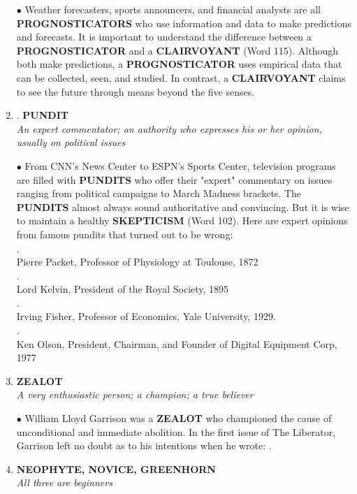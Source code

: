 \documentclass{book}
\begin{document}
\begin{enumerate}
$ \bullet $ Weather forecasters, sports announcers, and financial
analysts are all \textbf{PROGNOSTICATORS} who use information and data to make predictions and forecasts. It is
important to understand the difference between a
\textbf{PROGNOSTICATOR} and a \textbf{CLAIRVOYANT} (Word 115).
Although both make predictions, a \textbf{PROGNOSTICATOR} uses empirical data that can be collected, seen,
and studied. In contrast, a \textbf{CLAIRVOYANT} claims to
see the future through means beyond the five senses.

 \item. \textbf{PUNDIT}\\
\textit{An expert commentator; an authority who
expresses his or her opinion, usually on
political issues}

$ \bullet $ From CNN's News Center to ESPN's Sports Center,
television programs are filled with \textbf{PUNDITS} who
offer their "expert" commentary on issues ranging
from political campaigns to March Madness brackets.
The \textbf{PUNDITS} almost always sound authoritative and
convincing. But it is wise to maintain a healthy
\textbf{SKEPTICISM} (Word 102). Here are expert opinions
from famous pundits that turned out to be wrong:\\

.\\
Pierre Packet, Professor of Physiology at
Toulouse, 1872\\

.\\
Lord Kelvin, President of the Royal Society,
1895\\

.\\
Irving Fisher, Professor of Economics, Yale
University, 1929.\\

 .\\
Ken Olson, President, Chairman, and
Founder of Digital Equipment Corp, 1977

 \item \textbf{ZEALOT}\\
\textit{A very enthusiastic person; a champion; a true
believer}

$ \bullet $ William Lloyd Garrison was a \textbf{ZEALOT} who championed the cause of unconditional and immediate
abolition. In the first issue of The Liberator, Garrison
left no doubt as to his intentions when he wrote: .
 \item \textbf{NEOPHYTE, NOVICE, GREENHORN}\\
\textit{All three are beginners}


\end{enumerate}
\end{document}
